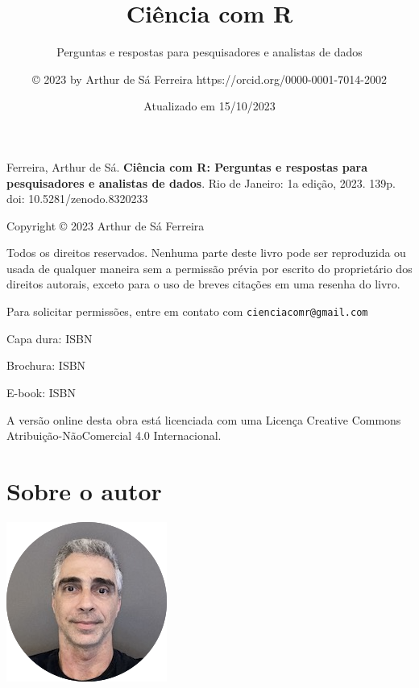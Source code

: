 \documentclass[
  a4paper,
]{book}
\title{\textbf{Ciência com R}}
\subtitle{Perguntas e respostas para pesquisadores e analistas de dados}
\author{© 2023 by Arthur de Sá Ferreira https://orcid.org/0000-0001-7014-2002}
\date{Atualizado em 15/10/2023}
\renewcommand{\href}[2]{#2\footnote{\url{#1}}}
\newcommand{\DisableFootNotes}{%
  \renewcommand{\footnote}[2][]{\relax}
}
\begin{document}
\maketitle


\newpage


\newpage

{
\setcounter{tocdepth}{1}
\tableofcontents
}
\listoffigures
\listoftables
\DisableFootNotes

\mainmatter
\clearpage
\markboth{}{}

Ferreira, Arthur de Sá. \textbf{Ciência com R: Perguntas e respostas para pesquisadores e analistas de dados}. Rio de Janeiro: 1a edição, 2023. 139p. \href{https://doi.org/10.5281/zenodo.8320233}{doi: 10.5281/zenodo.8320233}

\vspace*{\fill}

Copyright © 2023 Arthur de Sá Ferreira

Todos os direitos reservados. Nenhuma parte deste livro pode ser reproduzida ou usada de qualquer maneira sem a permissão prévia por escrito do proprietário dos direitos autorais, exceto para o uso de breves citações em uma resenha do livro.

Para solicitar permissões, entre em contato com \href{mailto:cienciacomr@gmail.com}{\nolinkurl{cienciacomr@gmail.com}}

Capa dura: ISBN

Brochura: ISBN

E-book: ISBN

A versão online desta obra está licenciada com uma Licença Creative Commons Atribuição-NãoComercial 4.0 Internacional.


\hypertarget{sobre-o-autor}{%
\chapter*{Sobre o autor}\label{sobre-o-autor}}

\markboth{}{}

\includegraphics{images/ASF.png}
\end{document}
